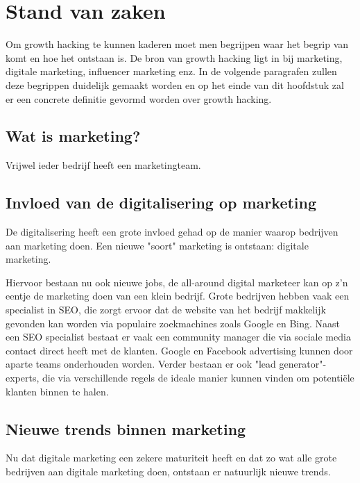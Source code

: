 \chapter{Stand van zaken}
\label{ch:stand-van-zaken}


Om growth hacking te kunnen kaderen moet men begrijpen waar het begrip van komt en hoe het ontstaan is. De bron van growth hacking ligt in bij marketing, digitale marketing, influencer marketing enz. In de volgende paragrafen zullen deze begrippen duidelijk gemaakt worden en op het einde van dit hoofdstuk zal er een concrete definitie gevormd worden over growth hacking.

\section{Wat is marketing?}
\label{sec:marketing}
Vrijwel ieder bedrijf heeft een marketingteam.

\section{Invloed van de digitalisering op marketing}
\label{sec:digitalisering-marketing}
De digitalisering heeft een grote invloed gehad op de manier waarop bedrijven aan marketing doen. Een nieuwe "soort" marketing is ontstaan: digitale marketing. 

Hiervoor bestaan nu ook nieuwe jobs, de all-around digital marketeer kan op z'n eentje de marketing doen van een klein bedrijf. Grote bedrijven hebben vaak een specialist in SEO, die zorgt ervoor dat de website van het bedrijf makkelijk gevonden kan worden via populaire zoekmachines zoals Google en Bing. Naast een SEO specialist bestaat er vaak een community manager die via sociale media contact direct heeft met de klanten. Google en Facebook advertising kunnen door aparte teams onderhouden worden. Verder bestaan er ook "lead generator"-experts, die via verschillende regels de ideale manier kunnen vinden om potentiële klanten binnen te halen.


\section{Nieuwe trends binnen marketing}
\label{sec:nieuwe-trends-marketing}
Nu dat digitale marketing een zekere maturiteit heeft en dat zo wat alle grote bedrijven aan digitale marketing doen, ontstaan er natuurlijk nieuwe trends. 

